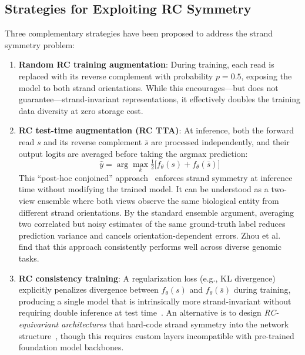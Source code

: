 \subsection{Strategies for Exploiting RC Symmetry}

Three complementary strategies have been proposed to address the strand symmetry problem:

\begin{enumerate}
    \item \textbf{Random RC training augmentation}: During training, each read is replaced with its reverse complement with probability $p=0.5$, exposing the model to both strand orientations. While this encourages---but does not guarantee---strand-invariant representations, it effectively doubles the training data diversity at zero storage cost.

    \item \textbf{RC test-time augmentation (RC TTA)}: At inference, both the forward read $s$ and its reverse complement $\bar{s}$ are processed independently, and their output logits are averaged before taking the argmax prediction:
    \begin{equation}
        \hat{y} = \arg\max_k \tfrac{1}{2}\bigl[ f_\theta(s) + f_\theta(\bar{s}) \bigr]
        \label{eq:rc-tta-bg}
    \end{equation}
    This ``post-hoc conjoined'' approach~\cite{Zhou2022rc} enforces strand symmetry at inference time without modifying the trained model. It can be understood as a two-view ensemble where both views observe the same biological entity from different strand orientations. By the standard ensemble argument, averaging two correlated but noisy estimates of the same ground-truth label reduces prediction variance and cancels orientation-dependent errors. Zhou et al.~\cite{Zhou2022rc} find that this approach consistently performs well across diverse genomic tasks.

    \item \textbf{RC consistency training}: A regularization loss (e.g., KL divergence) explicitly penalizes divergence between $f_\theta(s)$ and $f_\theta(\bar{s})$ during training, producing a single model that is intrinsically more strand-invariant without requiring double inference at test time~\cite{Ma2025rc}. An alternative is to design \emph{RC-equivariant architectures} that hard-code strand symmetry into the network structure~\cite{Brown2021rc}, though this requires custom layers incompatible with pre-trained foundation model backbones.
\end{enumerate}

